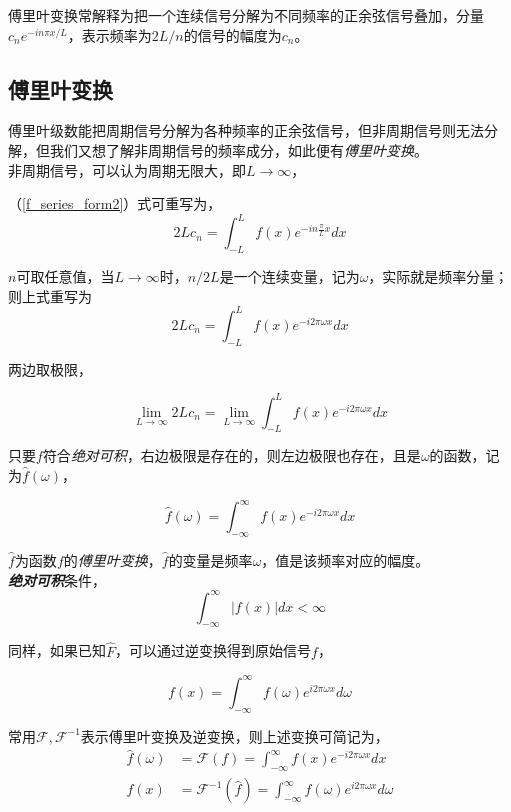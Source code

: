 傅里叶变换常解释为把一个连续信号分解为不同频率的正余弦信号叠加，分量$c_ne^{-in\pi x/L}$，表示频率为$2L/n$的信号的幅度为$c_n$。

\subsection{傅里叶变换}

	傅里叶级数能把周期信号分解为各种频率的正余弦信号，但非周期信号则无法分解，但我们又想了解非周期信号的频率成分，如此便有\textit{傅里叶变换}。\\

	非周期信号，可以认为周期无限大，即$L\rightarrow \infty$，

	（\ref{f_series_form2}）式可重写为，
	$$
		2L c_n = \int_{-L}^L f(x) e^{-in\frac{\pi}{L}x}dx
	$$

	$n$可取任意值，当$L\rightarrow \infty$时，$n/2L$是一个连续变量，记为$\omega$，实际就是频率分量；则上式重写为
	$$
		2L c_n = \int_{-L}^L f(x) e^{-i2\pi\omega x}dx
	$$	

	两边取极限，

	$$
		\lim_{L\rightarrow\infty} 2L c_n = \lim_{L\rightarrow\infty} \int_{-L}^L f(x) e^{-i2\pi\omega x}dx
	$$	

	只要$f$符合\textit{绝对可积}，右边极限是存在的，则左边极限也存在，且是$\omega$的函数，记为$\hat{f}(\omega)$，
	
	\begin{equation}
		\hat{f}(\omega) =  \int_{-\infty}^{\infty} f(x) e^{-i2\pi\omega x}dx\label{f_trans}
	\end{equation}

	$\hat{f}$为函数$f$的\textit{傅里叶变换}，$\hat{f}$的变量是频率$\omega$，值是该频率对应的幅度。\\

	\textit{\textbf{绝对可积}}条件，
	$$
		\int_{-\infty}^{\infty} |f(x)|dx < \infty
	$$

	同样，如果已知$\hat{F}$，可以通过逆变换得到原始信号$f$，

	\begin{equation}
		f(x) =  \int_{-\infty}^{\infty} f(\omega) e^{i2\pi\omega x}d\omega\label{inver_f_trans}
	\end{equation}

	常用$\mathcal{F},\mathcal{F}^{-1}$表示傅里叶变换及逆变换，则上述变换可简记为，
	\begin{align*}
		\hat{f}(\omega) &= \mathcal{F}(f) = \int_{-\infty}^{\infty} f(x) e^{-i2\pi\omega x}dx\\
		f(x) &= \mathcal{F}^{-1}(\hat{f}) = \int_{-\infty}^{\infty} f(\omega) e^{i2\pi\omega x}d\omega
	\end{align*}

